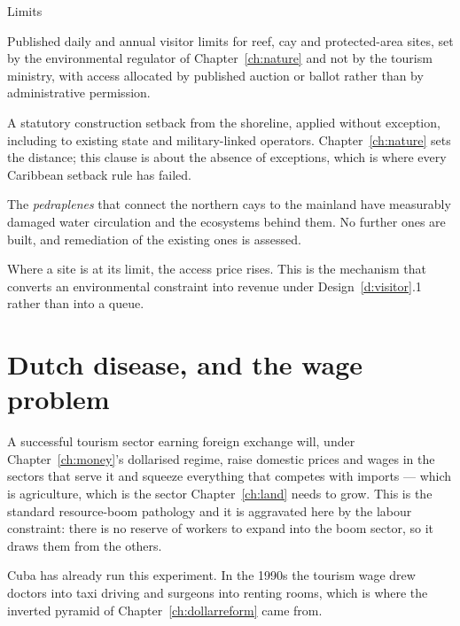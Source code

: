 \begin{design}{Limits}
\label{d:limits}
\begin{rules}
 Published daily and annual visitor limits for reef, cay and
protected-area sites, set by the environmental regulator of
Chapter~\ref{ch:nature} and not by the tourism ministry, with access allocated by
published auction or ballot rather than by administrative permission.

 A statutory construction setback from the shoreline,
applied without exception, including to existing state and military-linked
operators. Chapter~\ref{ch:nature} sets the distance; this clause is about the
absence of exceptions, which is where every Caribbean setback rule has failed.

 The \emph{pedraplenes} that connect the northern
cays to the mainland have measurably damaged water circulation and the
ecosystems behind them. No further ones are built, and remediation of the
existing ones is assessed.

 Where a site is at its limit, the access price rises.
This is the mechanism that converts an environmental constraint into revenue
under Design~\ref{d:visitor}.1 rather than into a queue.
\end{rules}
\end{design}

\section{Dutch disease, and the wage problem}

A successful tourism sector earning foreign exchange will, under
Chapter~\ref{ch:money}'s dollarised regime, raise domestic prices and wages in
the sectors that serve it and squeeze everything that competes with imports ---
which is agriculture, which is the sector Chapter~\ref{ch:land} needs to grow.
This is the standard resource-boom pathology and it is aggravated here by the
labour constraint: there is no reserve of workers to expand into the boom
sector, so it draws them from the others.

Cuba has already run this experiment. In the 1990s the tourism wage drew doctors
into taxi driving and surgeons into renting rooms, which is where the inverted
pyramid of Chapter~\ref{ch:dollarreform} came from.

